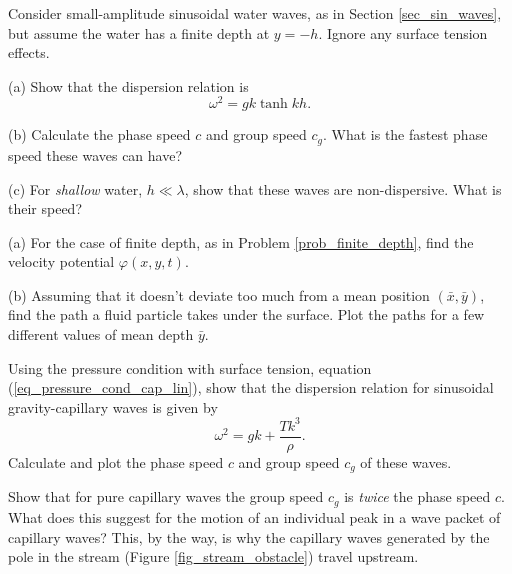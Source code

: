 \begin{problem}
\label{prob_finite_depth}
Consider small-amplitude sinusoidal water waves, as in Section \ref{sec_sin_waves}, but assume the water has a finite depth at $y = -h$.  Ignore any surface tension effects.

(a) Show that the dispersion relation is
\begin{equation}
\omega^2 = gk \tanh kh.
\end{equation}

(b) Calculate the phase speed $c$ and group speed $c_g$.  What is the fastest phase speed these waves can have?

(c) For \emph{shallow} water, $h \ll \lambda$, show that these waves are non-dispersive.  What is their speed?

\end{problem}

\begin{problem}
\label{prob_finite_depth_2}

(a) For the case of finite depth, as in Problem \ref{prob_finite_depth}, find the velocity potential $\varphi(x, y, t)$.  

(b) Assuming that it doesn't deviate too much from a mean position $(\bar{x}, \bar{y})$, find the path a fluid particle takes under the surface.  Plot the paths for a few different values of mean depth $\bar{y}$.

\end{problem}

\begin{problem}
\label{prob_grav_cap_dispersion}
Using the pressure condition with surface tension, equation (\ref{eq_pressure_cond_cap_lin}), show that the dispersion relation for sinusoidal gravity-capillary waves is given by
\[
\omega^2 = gk + \frac{Tk^3}{\rho}.
\]
Calculate and plot the phase speed $c$ and group speed $c_g$ of these waves.
\end{problem}

\begin{problem}
Show that for pure capillary waves the group speed $c_g$ is \emph{twice} the phase speed $c$.  What does this suggest for the motion of an individual peak in a wave packet of capillary waves?  This, by the way, is why the capillary waves generated by the pole in the stream (Figure \ref{fig_stream_obstacle}) travel upstream.
\end{problem}


